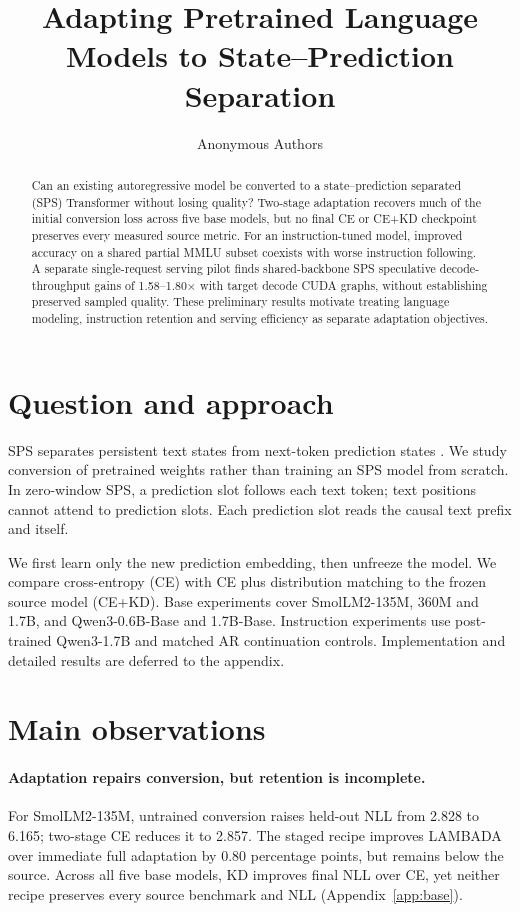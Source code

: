 \documentclass[11pt]{article}
\title{Adapting Pretrained Language Models to State--Prediction Separation}
\author{Anonymous Authors}
\begin{document}
\maketitle
\begin{abstract}
Can an existing autoregressive model be converted to a state--prediction separated (SPS) Transformer without losing quality? Two-stage adaptation recovers much of the initial conversion loss across five base models, but no final CE or CE+KD checkpoint preserves every measured source metric. For an instruction-tuned model, improved accuracy on a shared partial MMLU subset coexists with worse instruction following. A separate single-request serving pilot finds shared-backbone SPS speculative decode-throughput gains of 1.58--1.80$\times$ with target decode CUDA graphs, without establishing preserved sampled quality. These preliminary results motivate treating language modeling, instruction retention and serving efficiency as separate adaptation objectives.
\end{abstract}

\section{Question and approach}
SPS separates persistent text states from next-token prediction states \citep{monea2026sps}. We study conversion of pretrained weights rather than training an SPS model from scratch. In zero-window SPS, a prediction slot follows each text token; text positions cannot attend to prediction slots. Each prediction slot reads the causal text prefix and itself.

We first learn only the new prediction embedding, then unfreeze the model. We compare cross-entropy (CE) with CE plus distribution matching to the frozen source model (CE+KD). Base experiments cover SmolLM2-135M, 360M and 1.7B, and Qwen3-0.6B-Base and 1.7B-Base. Instruction experiments use post-trained Qwen3-1.7B and matched AR continuation controls. Implementation and detailed results are deferred to the appendix.

\section{Main observations}
\paragraph{Adaptation repairs conversion, but retention is incomplete.}
For SmolLM2-135M, untrained conversion raises held-out NLL from 2.828 to 6.165; two-stage CE reduces it to 2.857. The staged recipe improves LAMBADA over immediate full adaptation by 0.80 percentage points, but remains below the source. Across all five base models, KD improves final NLL over CE, yet neither recipe preserves every source benchmark and NLL (Appendix~\ref{app:base}).
\end{document}
